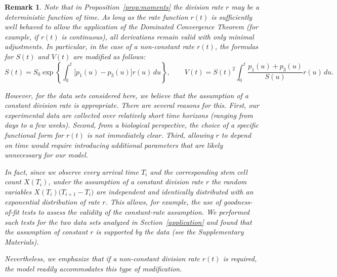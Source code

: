 \documentclass[pdflatex,sn-mathphys-num]{sn-jnl}
\theoremstyle{thmstyleone}%
\theoremstyle{thmstyletwo}%
\newtheorem{remark}{Remark}%
\theoremstyle{thmstylethree}%
\begin{document}
\begin{remark}
{\rm
Note that in Proposition~\ref{prop:moments} the division rate $r$ may be a deterministic function of time.
As long as the rate function $r(t)$ is sufficiently well behaved to allow the
application of the Dominated Convergence Theorem (for example, if $r(t)$ is continuous),
all derivations remain valid with only minimal adjustments. In particular, in the case
of a non-constant rate $r(t)$, the formulas for $S(t)$ and $V(t)$ are modified as follows:
\begin{equation*}
S(t)=S_0 \exp\!\left\{\int_0^t \bigl[p_1(u)-p_3(u)\bigr]r(u)\,du \right\},\quad\quad
V(t)=S(t)^2\int_0^t \frac{p_1(u)+p_3(u)}{S(u)}r(u)\,du.
\end{equation*}

However, for the data sets considered here, we believe that the assumption of a constant
division rate is appropriate. There are several reasons for this. First, our experimental
data are collected over relatively short time horizons (ranging from days to a few weeks).
Second, from a biological perspective, the choice of a specific functional form for $r(t)$
is not immediately clear. Third, allowing $r$ to depend on time would require introducing
additional parameters that are likely unnecessary for our model.

In fact, since we observe every arrival time $T_i$ and the corresponding stem cell count $X(T_i)$,
under the assumption of a constant division rate $r$ the random variables $X(T_i)\bigl(T_{i+1}-T_i\bigr)$
are independent and identically distributed with an exponential distribution of rate $r$.
This allows, for example, the use of goodness-of-fit tests to assess the validity of the
constant-rate assumption. We performed such tests for the two data sets analyzed in Section~\ref{application}
and found that the assumption of constant $r$ is supported by the data (see the Supplementary Materials).  

Nevertheless, we emphasize that if a non-constant division rate $r(t)$ is required,
the model readily accommodates this type of modification.
}\end{remark}
\end{document}
